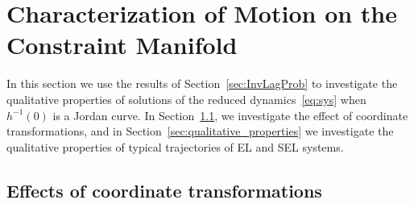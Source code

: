 \section{Characterization of Motion on the Constraint Manifold}
\label{sec:MotionCharac}

In this section we use the results of Section~\ref{sec:InvLagProb} to
investigate the qualitative properties of solutions of the reduced
dynamics~\eqref{eq:sys}  when $h^{-1}(0)$ is a Jordan
curve. In Section~\ref{sec:coord_transformations}, we investigate the
effect of coordinate transformations, and in
Section~\ref{sec:qualitative_properties} we investigate the
qualitative properties of typical trajectories of EL and SEL systems.

\subsection{Effects of coordinate transformations}\label{sec:coord_transformations}

